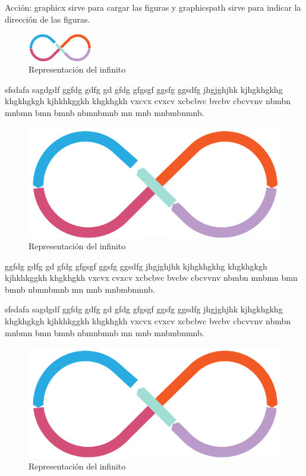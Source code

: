 \documentclass[a4paper,11pt]{article}
\begin{document}
\begin{flushleft}
		Acción: graphicx sirve para cargar las figuras y graphicspath sirve para indicar la dirección de las figuras.\newline
		
		\begin{figure}[h]
			\centering
			\includegraphics[width=0.25\textwidth]{flujo}
			\caption{Representación del infinito}
			\label{fig:flujo1}
		\end{figure}
		
		\begin{minipage}{0.99\textwidth}
			
			sfsdafa sagdgdf ggfdg gdfg gd gfdg gfgsgf ggsfg ggsdfg jhgjghjhk kjhgkhgkhg khgkhgkgh kjhkhkggkh khgkhgkh vxcvx cvxcv xcbcbvc bvcbv cbcvvnv nbmbn mnbmn bmn bmnb nbmnbmnb mn mnb mnbmbnmnb.
			
			\begin{figure}
				\centering
				\includegraphics[width=0.9\linewidth]{flujo}
				\caption{Representación del infinito}
				\label{fig:flujo2}
			\end{figure}
			
			ggfdg gdfg gd gfdg gfgsgf ggsfg ggsdfg jhgjghjhk kjhgkhgkhg khgkhgkgh kjhkhkggkh khgkhgkh vxcvx cvxcv xcbcbvc bvcbv cbcvvnv nbmbn mnbmn bmn bmnb nbmnbmnb mn mnb mnbmbnmnb.
			
			sfsdafa sagdgdf ggfdg gdfg gd gfdg gfgsgf ggsfg ggsdfg jhgjghjhk kjhgkhgkhg khgkhgkgh kjhkhkggkh khgkhgkh vxcvx cvxcv xcbcbvc bvcbv cbcvvnv nbmbn mnbmn bmn bmnb nbmnbmnb mn mnb mnbmbnmnb.
			
			\begin{figure}
				\centering
				\includegraphics[width=0.9\linewidth]{flujo}
				\caption{Representación del infinito}
				\label{fig:flujo3}
			\end{figure}
			

\end{minipage}
\end{flushleft}
\end{document}

